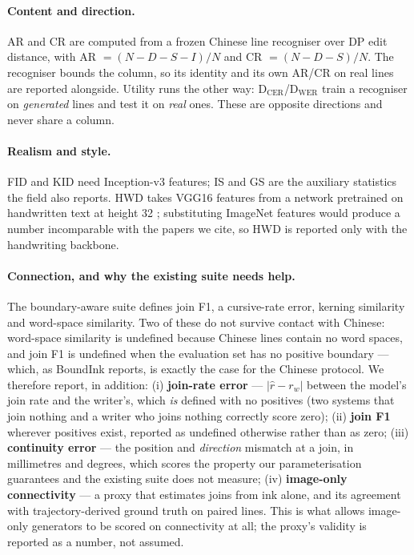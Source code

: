 \documentclass[conference]{IEEEtran}
\begin{document}
\paragraph{Content and direction.} AR and CR are computed from a frozen Chinese line recogniser
over DP edit distance, with AR $=(N-D-S-I)/N$ and CR $=(N-D-S)/N$. The recogniser bounds the
column, so its identity and its own AR/CR on real lines are reported alongside. Utility runs
the other way: D$_{\text{CER}}$/D$_{\text{WER}}$ train a recogniser on \emph{generated} lines
and test it on \emph{real} ones. These are opposite directions and never share a column.

\paragraph{Realism and style.} FID and KID need Inception-v3 features; IS and GS are the
auxiliary statistics the field also reports. HWD takes VGG16 features from a network
pretrained on handwritten text at height 32 \cite{hwd}; substituting ImageNet features would
produce a number incomparable with the papers we cite, so HWD is reported only with the
handwriting backbone.

\paragraph{Connection, and why the existing suite needs help.} The boundary-aware suite
\cite{boundink} defines join F1, a cursive-rate error, kerning similarity and word-space
similarity. Two of these do not survive contact with Chinese: word-space similarity is
undefined because Chinese lines contain no word spaces, and join F1 is undefined when the
evaluation set has no positive boundary --- which, as BoundInk reports, is exactly the case
for the Chinese protocol. We therefore report, in addition:
(i) \textbf{join-rate error} --- $|\hat r - r_w|$ between the model's join rate and the
writer's, which \emph{is} defined with no positives (two systems that join nothing and a
writer who joins nothing correctly score zero);
(ii) \textbf{join F1} wherever positives exist, reported as undefined otherwise rather than
as zero;
(iii) \textbf{continuity error} --- the position and \emph{direction} mismatch at a join, in
millimetres and degrees, which scores the property our parameterisation guarantees and the
existing suite does not measure;
(iv) \textbf{image-only connectivity} --- a proxy that estimates joins from ink alone, and
its agreement with trajectory-derived ground truth on paired lines. This is what allows
image-only generators to be scored on connectivity at all; the proxy's validity is reported
as a number, not assumed.
\end{document}
